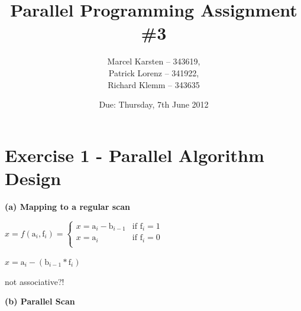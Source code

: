 \documentclass[a4paper,twoside,11pt]{article}
\begin{document}
\pagestyle{fancyplain}

\title{Parallel Programming Assignment \#3} 
\author{Marcel Karsten -- 343619,\\ Patrick Lorenz -- 341922,\\ Richard Klemm -- 343635 }
\date{Due: Thursday, 7th June 2012} %
\maketitle

\lhead{}
\renewcommand{\headrulewidth}{0px}



\section{Exercise 1 - Parallel Algorithm Design}

\textbf{(a) Mapping to a regular scan}

$x = f(\text{a}_i,\text{f}_i) = \begin{cases} x = \text{a}_i -\text{b}_{i-1} & \text{if } \text{f}_i = 1 \\
								x = \text{a}_i & \text{if } \text{f}_i = 0 \\
\end{cases}$

$x = \text{a}_i  - ( \text{b}_{i-1} * \text{f}_i)$

not associative?!



\textbf{(b) Parallel Scan}
\end{document}
